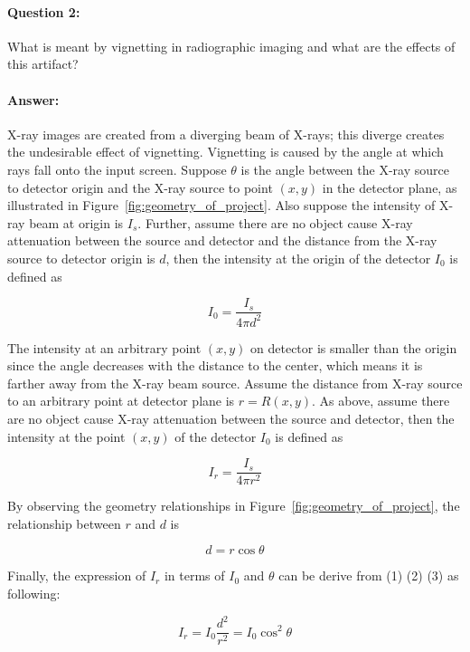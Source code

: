 \documentclass[12pt, letter]{article}
\begin{document}
\paragraph{Question 2:} What is meant by vignetting in radiographic imaging and what are the effects of this artifact?

\paragraph{Answer:} 
X-ray images are created from a diverging beam of X-rays; this diverge creates the undesirable effect of vignetting. Vignetting is caused by the angle at which rays fall onto the input screen. Suppose $\theta$ is the angle between the X-ray source to detector origin and the X-ray source to point $(x, y)$ in the detector plane, as illustrated in Figure~\ref{fig:geometry_of_project}. Also suppose the intensity of X-ray beam at origin is $I_s$. Further, assume there are no object cause X-ray attenuation between the source and detector and the distance from the X-ray source to detector origin is $d$, then the intensity at the origin of the detector $I_0$ is defined as

\begin{equation}
    I_0 = \frac{I_s}{4 \pi d^2}
\end{equation}

The intensity at an arbitrary point $(x, y)$ on detector is smaller than the origin since the angle decreases with the distance to the center, which means it is farther away from the X-ray beam source. Assume the distance from X-ray source to an arbitrary point at detector plane is $r = R(x, y)$. As above, assume there are no object cause X-ray attenuation between the source and detector, then the intensity at the point $(x, y)$ of the detector $I_0$ is defined as

\begin{equation}
    I_r = \frac{I_s}{4 \pi r^2}
\end{equation}

By observing the geometry relationships in Figure~\ref{fig:geometry_of_project}, the relationship between $r$ and $d$ is

\begin{equation}
    d = r\cos{\theta}
\end{equation}

Finally, the expression of $I_r$ in terms of $I_0$ and $\theta$ can be derive from (1) (2) (3) as following:

\begin{equation}
    I_r = I_0\frac{d^2}{r^2} = I_0\cos^2{\theta}
\end{equation}
\end{document}
